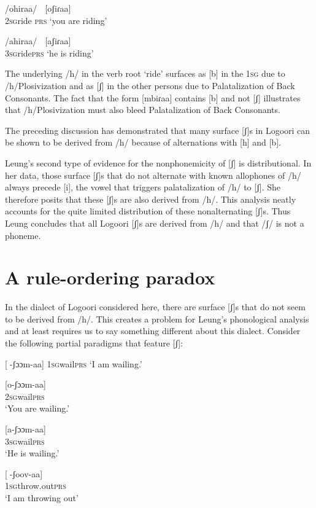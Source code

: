 \documentclass[output=paper]{langsci/langscibook}
\begin{document}
\ea{}
 /ohiraa/    \textsc{[}oʃiɾaa]\\{}
\textsc{2sg}ride \textsc{prs}
\glt ‘you are riding’
\z  


\ea{}
 /ahiraa/    [aʃiɾaa]  \\{}
\textsc{3sg}ride\textsc{prs}
\glt ‘he is riding’
\z

The underlying /h/ in the verb root ‘ride’ surfaces as [b] in the 1\textsc{sg} due to /h/Plosivization and as [ʃ] in the other persons due to Palatalization of Back Consonants. The fact that the form [mbiɾaa] contains [b] and not [ʃ] illustrates that /h/Plosivization must also bleed Palatalization of Back Consonants. 

The preceding discussion has demonstrated that many surface [ʃ]s in Logoori can be shown to be derived from /h/ because of alternations with [h] and [b]. 

Leung’s second type of evidence for the nonphonemicity of [ʃ] is distributional. In her data, those surface [ʃ]s that do not alternate with known allophones of /h/ always precede [i], the vowel that triggers palatalization of /h/ to [ʃ]. She therefore posits that these [ʃ]s are also derived from /h/. This analysis neatly accounts for the quite limited distribution of these nonalternating [ʃ]s. Thus Leung concludes that all Logoori [ʃ]s are derived from /h/ and that /ʃ/ is not a phoneme.

\section{A rule-ordering paradox}

In the dialect of Logoori considered here, there are surface [ʃ]s that do not seem to be derived from /h/. This creates a problem for Leung’s phonological analysis and at least requires us to say something different about this dialect. Consider the following partial paradigms that feature [ʃ]:



\ea{} [-ʃɔɔm-aa]
\textsc{1sg}wail\textsc{prs}  
\glt ‘I am wailing.’
\z


\ea{}
 [o-ʃɔɔm-aa] \\
\textsc{2sg}wail\textsc{prs}  \\
\glt ‘You are wailing.’
\z


\ea{} 
[a-ʃɔɔm-aa] \\
\textsc{3sg}wail\textsc{prs}\\
\glt ‘He is wailing.’
\z


\ea{} 
[-ʃoov-aa]  \\
\textsc{1sg}throw.out\textsc{prs} \\
\glt ‘I am throwing out’
\z
\end{document}
